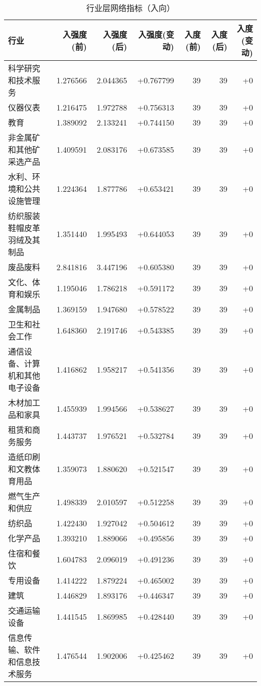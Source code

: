 \begin{table}[htbp]
\centering
\caption{行业层网络指标（入向）}
\label{tab:industry_in_stats}
\begin{tabular}{lrrrrrr}
\toprule
行业 & 入强度(前) & 入强度(后) & 入强度(变动) & 入度(前) & 入度(后) & 入度(变动) \\
\midrule
科学研究和技术服务 & 1.276566 & 2.044365 & +0.767799 & 39 & 39 & +0 \\
仪器仪表 & 1.216475 & 1.972788 & +0.756313 & 39 & 39 & +0 \\
教育 & 1.389092 & 2.133241 & +0.744150 & 39 & 39 & +0 \\
非金属矿和其他矿采选产品 & 1.409591 & 2.083176 & +0.673585 & 39 & 39 & +0 \\
水利、环境和公共设施管理 & 1.224364 & 1.877786 & +0.653421 & 39 & 39 & +0 \\
纺织服装鞋帽皮革羽绒及其制品 & 1.351440 & 1.995493 & +0.644053 & 39 & 39 & +0 \\
废品废料 & 2.841816 & 3.447196 & +0.605380 & 39 & 39 & +0 \\
文化、体育和娱乐 & 1.195046 & 1.786218 & +0.591172 & 39 & 39 & +0 \\
金属制品 & 1.369159 & 1.947680 & +0.578522 & 39 & 39 & +0 \\
卫生和社会工作 & 1.648360 & 2.191746 & +0.543385 & 39 & 39 & +0 \\
通信设备、计算机和其他电子设备 & 1.416862 & 1.958217 & +0.541356 & 39 & 39 & +0 \\
木材加工品和家具 & 1.455939 & 1.994566 & +0.538627 & 39 & 39 & +0 \\
租赁和商务服务 & 1.443737 & 1.976521 & +0.532784 & 39 & 39 & +0 \\
造纸印刷和文教体育用品 & 1.359073 & 1.880620 & +0.521547 & 39 & 39 & +0 \\
燃气生产和供应 & 1.498339 & 2.010597 & +0.512258 & 39 & 39 & +0 \\
纺织品 & 1.422430 & 1.927042 & +0.504612 & 39 & 39 & +0 \\
化学产品 & 1.393210 & 1.889066 & +0.495856 & 39 & 39 & +0 \\
住宿和餐饮 & 1.604783 & 2.096019 & +0.491236 & 39 & 39 & +0 \\
专用设备 & 1.414222 & 1.879224 & +0.465002 & 39 & 39 & +0 \\
建筑 & 1.446829 & 1.893176 & +0.446347 & 39 & 39 & +0 \\
交通运输设备 & 1.441545 & 1.869985 & +0.428440 & 39 & 39 & +0 \\
信息传输、软件和信息技术服务 & 1.476544 & 1.902006 & +0.425462 & 39 & 39 & +0 \\

\end{tabular}
\end{table}
